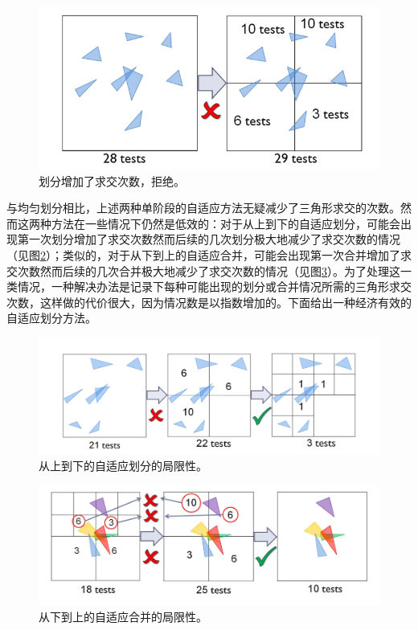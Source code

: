 \documentclass[a4paper,twoside]{article}
\begin{document}
\begin{figure}[H]
    \centering
    \includegraphics[width=0.8\linewidth]{png/3.png}
    \caption{划分增加了求交次数，拒绝。}
    \label{fig:3}
\end{figure}

与均匀划分相比，上述两种单阶段的自适应方法无疑减少了三角形求交的次数。然而这两种方法在一些情况下仍然是低效的：对于从上到下的自适应划分，可能会出现第一次划分增加了求交次数然而后续的几次划分极大地减少了求交次数的情况（见图\ref{fig:4}）；类似的，对于从下到上的自适应合并，可能会出现第一次合并增加了求交次数然而后续的几次合并极大地减少了求交次数的情况（见图\ref{fig:5}）。为了处理这一类情况，一种解决办法是记录下每种可能出现的划分或合并情况所需的三角形求交次数，这样做的代价很大，因为情况数是以指数增加的。下面给出一种经济有效的自适应划分方法。

\begin{figure}[H]
    \centering
    \includegraphics[width=1\linewidth]{png/4.png}
    \caption{从上到下的自适应划分的局限性。}
    \label{fig:4}
\end{figure}

\begin{figure}[H]
    \centering
    \includegraphics[width=1\linewidth]{png/5.png}
    \caption{从下到上的自适应合并的局限性。}
    \label{fig:5}
\end{figure}
\end{document}
